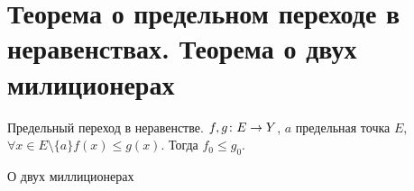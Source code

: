 \section{Теорема о предельном переходе в неравенствах. Теорема о двух милиционерах}


\begin{theorem}{Предельный переход в неравенстве.}
$f, g\colon E \rightarrow Y$, $a$ предельная точка $E$, $\forall x \in E\setminus \{a\} f(x) \leqslant g(x)$. Тогда $f_0 \leqslant g_0$.
\end{theorem}

\begin{theorem}{О двух миллиционерах}
\end{theorem}
